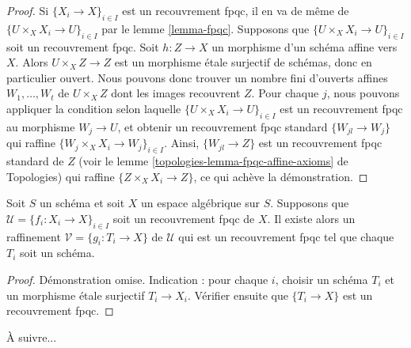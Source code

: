 \begin{proof}
Si $\{X_i \to X\}_{i \in I}$ est un recouvrement fpqc, il en va de même de
$\{U \times_X X_i \to U\}_{i \in I}$ par le lemme \ref{lemma-fpqc}.
Supposons que $\{U \times_X X_i \to U\}_{i \in I}$ soit un recouvrement fpqc.
Soit $h : Z \to X$ un morphisme d'un schéma affine vers $X$.
Alors $U \times_X Z \to Z$ est un morphisme \'etale surjectif
de schémas, donc en particulier ouvert. Nous pouvons donc trouver un nombre fini d'ouverts affines
$W_1, \ldots, W_t$ de $U \times_X Z$ dont les images recouvrent $Z$.
Pour chaque $j$, nous pouvons appliquer la condition selon laquelle
$\{U \times_X X_i \to U\}_{i \in I}$ est un recouvrement fpqc
au morphisme $W_j \to U$, et obtenir un recouvrement fpqc standard
$\{W_{jl} \to W_j\}$ qui raffine $\{W_j \times_X X_i \to W_j\}_{i \in I}$.
Ainsi, $\{W_{jl} \to Z\}$ est un recouvrement fpqc standard de $Z$
(voir le
lemme \ref{topologies-lemma-fpqc-affine-axioms} de Topologies)
qui raffine $\{Z \times_X X_i \to Z\}$, ce qui achève la démonstration.
\end{proof}

\begin{lemma}
\label{lemma-refine-fpqc-schemes}
Soit $S$ un schéma et soit $X$ un espace algébrique sur $S$.
Supposons que $\mathcal{U} = \{f_i : X_i \to X\}_{i \in I}$ soit un
recouvrement fpqc de $X$. Il existe alors un raffinement
$\mathcal{V} = \{g_i : T_i \to X\}$ de $\mathcal{U}$ qui est un
recouvrement fpqc tel que chaque $T_i$ soit un schéma.
\end{lemma}

\begin{proof}
Démonstration omise. Indication : pour chaque $i$, choisir un schéma $T_i$ et un morphisme \'etale
surjectif $T_i \to X_i$. Vérifier ensuite que $\{T_i \to X\}$ est un recouvrement fpqc.
\end{proof}

\noindent
À suivre...












